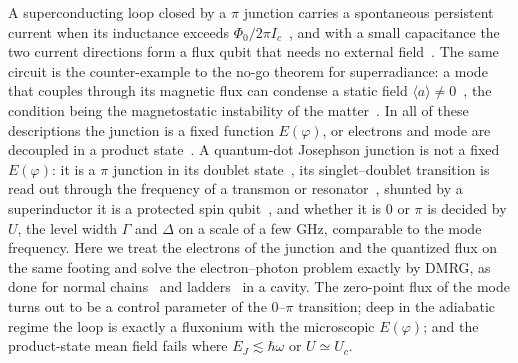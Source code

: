 A superconducting loop closed by a $\pi$ junction carries a spontaneous persistent current when its
inductance exceeds $\Phi_0/2\pi I_c$~\cite{BKS1977,Tsuei2000,Ryazanov2001,Bauer2004}, and with a small
capacitance the two current directions form a flux qubit that needs no external
field~\cite{Ioffe1999,Yamashita2005,Yamashita2006,Kawabata2006,Feofanov2010,Kim2024}. The same circuit is the
counter-example to the no-go theorem for superradiance: a mode that couples through its magnetic flux can
condense a static field $\langle a\rangle\neq0$~\cite{NatafCiuti2010,Viehmann2011,Bamba2016,Jaako2016,Nataf2019,Guerci2020,Andolina2020,RomanRoche2021},
the condition being the magnetostatic instability of the matter~\cite{Andolina2020,Mercurio2024}. In all
of these descriptions the junction is a fixed function $E(\varphi)$, or electrons and mode are decoupled
in a product state~\cite{Varrica2026}. A quantum-dot Josephson junction is not a fixed $E(\varphi)$: it is a
$\pi$ junction in its doublet
state~\cite{GlazmanMatveev1989,SpivakKivelson1991,Vecino2003,Karrasch2008,MengFlorensSimon2009,vanDam2006,Cleuziou2006,Delagrange2015},
its singlet--doublet transition is read out through the frequency of a transmon or
resonator~\cite{Bargerbos2022,Hays2021,PitaVidal2023}, shunted by a superinductor it is a protected spin
qubit~\cite{delOlmo2026,Padurariu2010}, and whether it is $0$ or $\pi$ is decided by $U$, the level width
$\Gamma$ and $\Delta$ on a scale of a few GHz, comparable to the mode frequency. Here we treat the electrons
of the junction and the quantized flux on the same footing and solve the electron--photon problem exactly
by DMRG, as done for normal chains~\cite{Passetti2023,Eckhardt2022} and ladders~\cite{Bacciconi2023} in a
cavity. The zero-point flux of the mode turns out to be a control parameter of the $0$--$\pi$ transition;
deep in the adiabatic regime the loop is exactly a fluxonium with the microscopic $E(\varphi)$; and the
product-state mean field fails where $E_J\lesssim\hbar\omega$ or $U\simeq U_c$.

